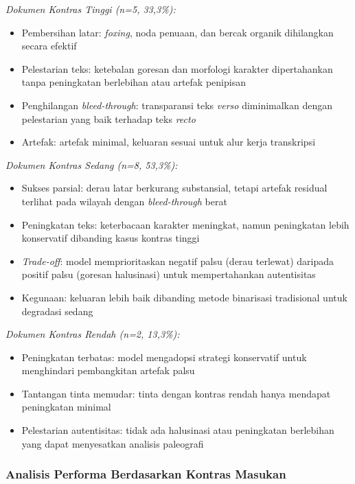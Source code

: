 \documentclass[12pt,a4paper]{article}
\begin{document}
\textit{Dokumen Kontras Tinggi (n=5, 33,3\%):}
\begin{itemize}[nosep]
    \item Pembersihan latar: \textit{foxing}, noda penuaan, dan bercak organik dihilangkan secara efektif
    \item Pelestarian teks: ketebalan goresan dan morfologi karakter dipertahankan tanpa peningkatan berlebihan atau artefak penipisan
    \item Penghilangan \textit{bleed-through}: transparansi teks \textit{verso} diminimalkan dengan pelestarian yang baik terhadap teks \textit{recto}
    \item Artefak: artefak minimal, keluaran sesuai untuk alur kerja transkripsi
\end{itemize}

\textit{Dokumen Kontras Sedang (n=8, 53,3\%):}
\begin{itemize}[nosep]
    \item Sukses parsial: derau latar berkurang substansial, tetapi artefak residual terlihat pada wilayah dengan \textit{bleed-through} berat
    \item Peningkatan teks: keterbacaan karakter meningkat, namun peningkatan lebih konservatif dibanding kasus kontras tinggi
    \item \textit{Trade-off}: model memprioritaskan negatif palsu (derau terlewat) daripada positif palsu (goresan halusinasi) untuk mempertahankan autentisitas
    \item Kegunaan: keluaran lebih baik dibanding metode binarisasi tradisional untuk degradasi sedang
\end{itemize}

\textit{Dokumen Kontras Rendah (n=2, 13,3\%):}
\begin{itemize}[nosep]
    \item Peningkatan terbatas: model mengadopsi strategi konservatif untuk menghindari pembangkitan artefak palsu
    \item Tantangan tinta memudar: tinta dengan kontras rendah hanya mendapat peningkatan minimal
    \item Pelestarian autentisitas: tidak ada halusinasi atau peningkatan berlebihan yang dapat menyesatkan analisis paleografi
\end{itemize}

\vspace{0.8em}

\subsubsection{Analisis Performa Berdasarkan Kontras Masukan}
\label{subsubsec:anri-analisis-kontras}
\end{document}
